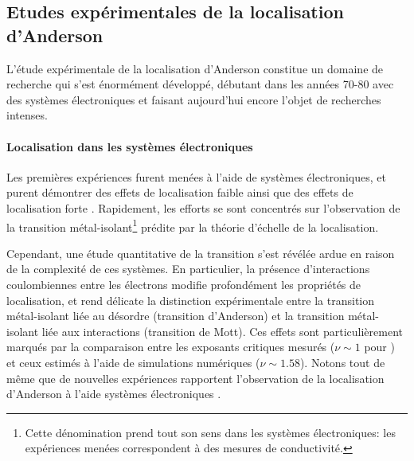 \subsection{Etudes expérimentales de la localisation d'Anderson}
L'étude expérimentale de la localisation d'Anderson constitue un domaine de recherche qui s'est énormément développé, débutant dans les années 70-80 avec des systèmes électroniques et faisant aujourd'hui encore l'objet de recherches intenses.

\paragraph*{Localisation dans les systèmes électroniques}
Les premières expériences furent menées à l'aide de systèmes électroniques, et purent démontrer des effets de localisation faible ainsi que des effets de localisation forte \citep{mott1979electronic,paalanen1983critical}. Rapidement, les efforts se sont concentrés sur l'observation de la transition métal-isolant\footnote{Cette dénomination prend tout son sens dans les systèmes électroniques: les expériences menées correspondent à des mesures de conductivité.} prédite par la théorie d'échelle de la localisation. 

Cependant, une étude quantitative de la transition s'est révélée ardue en raison de la complexité de ces systèmes. En particulier, la présence d'interactions coulombiennes entre les électrons modifie profondément les propriétés de localisation, et rend délicate la distinction expérimentale entre la transition métal-isolant liée au désordre (transition d'Anderson) et la transition métal-isolant liée aux interactions (transition de Mott). Ces effets sont particulièrement marqués par la comparaison entre les exposants critiques mesurés ($\nu\sim 1$ pour \citep{shlimak1996determination}) et ceux estimés à l'aide de simulations numériques ($\nu\sim1.58$). Notons tout de même que de nouvelles expériences rapportent l'observation de la localisation d'Anderson à l'aide systèmes électroniques \citep{siegrist2011disorder,ying2016anderson}.

